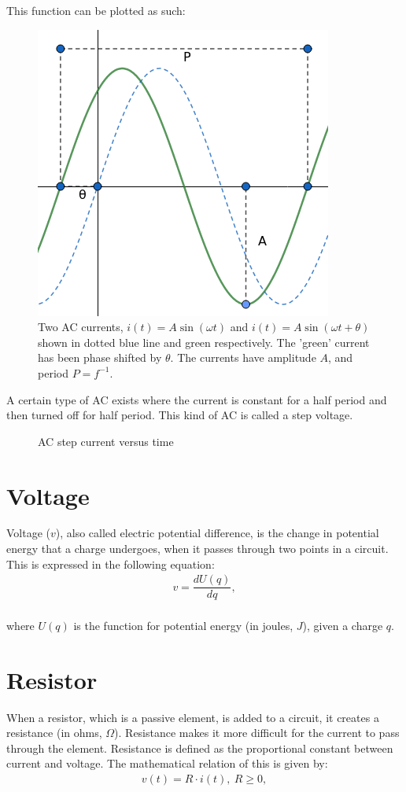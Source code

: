 This function can be plotted as such:
\begin{figure}[H]
	\centering
	\includegraphics[scale=0.7]{fig/img/AC.png}
	\caption{Two AC currents, $i(t)=A\sin(\omega t)$ and $i(t)=A\sin(\omega t+\theta)$ shown in dotted blue line and green respectively. The 'green' current has been phase shifted by $\theta$. The currents have amplitude $A$, and period $P=f^{-1}$.}
\end{figure}
\noindent A certain type of AC exists where the current is constant for a half period and then turned off for half period. This kind of AC is called a step voltage.
\begin{figure}[H] 

\caption{AC step current versus time}
\end{figure}
\section{Voltage}
Voltage ($v$), also called electric potential difference, is the change in potential energy that a charge undergoes, when it passes through two points in a circuit. This is expressed in the following equation:
\begin{align*}
	v=\dfrac{dU(q)}{dq},
\end{align*}
\\
where $U(q)$ is the function for potential energy (in joules, $J$), given a charge $q$.
\section{Resistor}
When a resistor, which is a passive element, is added to a circuit, it creates a resistance (in ohms, $\Omega$). Resistance makes it more difficult for the current to pass through the element. Resistance is defined as the proportional constant between current and voltage. The mathematical relation of this is given by: \cite[p.~22]{bcircuit5}
\begin{align} 
\label{Ohm}
v(t)=R\cdot i(t),\ R\geq0,
\end{align}
